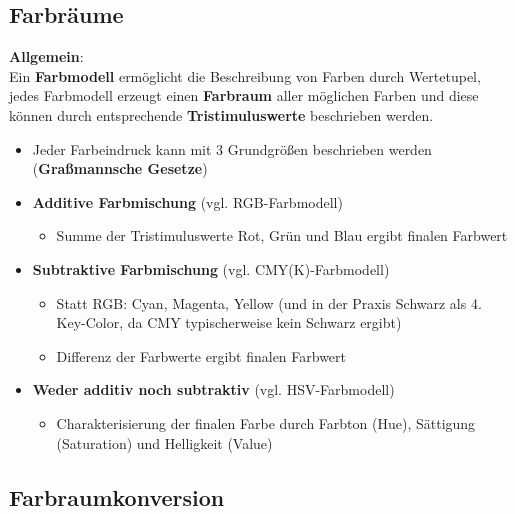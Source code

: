 \documentclass[10pt,a4paper]{article}
\begin{document}
	\subsection{Farbräume}
	\label{bfp:sub:farbraeume}

	\textbf{Allgemein}:\\
	Ein \textbf{Farbmodell} ermöglicht die Beschreibung von Farben durch Wertetupel, jedes Farbmodell erzeugt einen \textbf{Farbraum} aller möglichen Farben und diese können durch entsprechende \textbf{Tristimuluswerte} beschrieben werden.

	\begin{itemize}
		\item Jeder Farbeindruck kann mit 3 Grundgrößen beschrieben werden (\textbf{Graßmannsche Gesetze})
		\item \textbf{Additive Farbmischung} (vgl. RGB-Farbmodell)
		\begin{itemize}
			\item Summe der Tristimuluswerte Rot, Grün und Blau ergibt finalen Farbwert
		\end{itemize}
		\item \textbf{Subtraktive Farbmischung} (vgl. CMY(K)-Farbmodell)
		\begin{itemize}
			\item Statt RGB: Cyan, Magenta, Yellow (und in der Praxis Schwarz als 4. Key-Color, da CMY typischerweise kein Schwarz ergibt)
			\item Differenz der Farbwerte ergibt finalen Farbwert
		\end{itemize}
		\item \textbf{Weder additiv noch subtraktiv} (vgl. HSV-Farbmodell)
		\begin{itemize}
			\item Charakterisierung der finalen Farbe durch Farbton (Hue), Sättigung (Saturation) und Helligkeit (Value)
		\end{itemize}
	\end{itemize}

	\newpage
	\subsection{Farbraumkonversion}
	\label{bfp:sub:farbraumkonversion}
\end{document}
